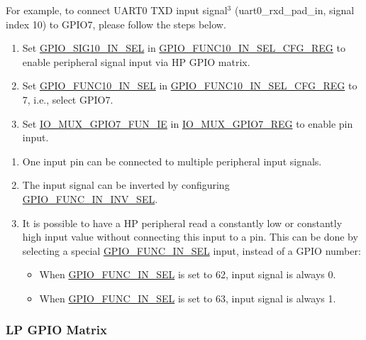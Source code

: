 \documentclass[main\_\_EN.tex]{subfiles}
\begin{document}
For example, to connect UART0 TXD input signal\hyperref[input-note-3]{$^3$} (uart0\_rxd\_pad\_in, signal index 10) to GPIO7, please follow the steps below.

\begin{enumerate}
\item Set \hyperref[regdesc:GPIOFUNCNINSELCFGREG]{GPIO\_SIG10\_IN\_SEL} in \hyperref[fielddesc:GPIOSIGNINSEL]{GPIO\_FUNC10\_IN\_SEL\_CFG\_REG} to enable peripheral signal input via HP GPIO matrix.
\item Set \hyperref[fielddesc:GPIOFUNCNINSEL]{GPIO\_FUNC10\_IN\_SEL} in \hyperref[regdesc:GPIOFUNCNINSELCFGREG]{GPIO\_FUNC10\_IN\_SEL\_CFG\_REG} to 7, i.e., select GPIO7.
\item Set \hyperref[fielddesc:IOMUXGPIONFUNIE]{IO\_MUX\_GPIO7\_FUN\_IE} in \hyperref[regdesc:IOMUXGPIONREG]{IO\_MUX\_GPIO7\_REG} to enable pin input.
\end{enumerate}

\begin{tiplisting}
\vspace{-2em}
\begin{enumerate}
\item \label{input-note-1} One input pin can be connected to multiple peripheral input signals.
\item \label{input-note-2} The input signal can be inverted by configuring \hyperref[fielddesc:GPIOFUNCNININVSEL]{GPIO\_FUNC\_IN\_INV\_SEL}.
\item \label{input-note-3} It is possible to have a HP peripheral read a constantly low or constantly high input value without connecting this input to a pin. This can be done by selecting a special \hyperref[fielddesc:GPIOFUNCNINSEL]{GPIO\_FUNC\_IN\_SEL} input, instead of a GPIO number:
\begin {itemize}
\item When \hyperref[fielddesc:GPIOFUNCNINSEL]{GPIO\_FUNC\_IN\_SEL} is set to 62, input signal is always 0.
\item When \hyperref[fielddesc:GPIOFUNCNINSEL]{GPIO\_FUNC\_IN\_SEL} is set to 63, input signal is always 1.
\end{itemize}
\end{enumerate}
\end{tiplisting}

\subsubsection{LP GPIO Matrix}
\end{document}
